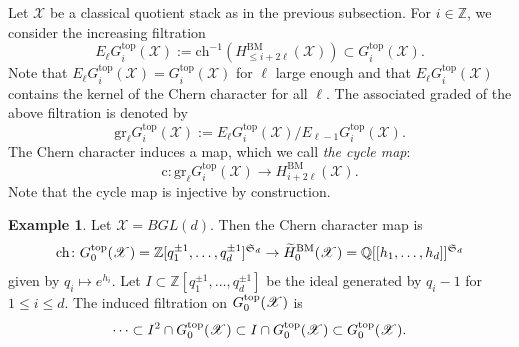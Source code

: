 \documentclass [11pt,oneside,a4paper,mathscr]{amsart}
\theoremstyle{definition}
\newtheorem{example}[thm]{Example}
\renewcommand{\leq}{\leqslant}
\newcommand{\X}{\mathscr{X}}
\newcommand{\ch}{\operatorname{ch}}
\begin{document}
Let $\X$ be a classical quotient stack as in the previous subsection.
For $i\in\mathbb{Z}$, we consider the increasing filtration 
\begin{equation}\label{def:filtration}
E_{ \ell}G^{\mathrm{top}}_i(\mathscr{X}):=\mathrm{ch}^{-1}\left(H^{\mathrm{BM}}_{\leq i+2\ell}(\mathscr{X})\right)\subset G^{\mathrm{top}}_i(\mathscr{X}).
\end{equation}
Note that $E_{\ell}G^{\mathrm{top}}_i(\mathscr{X})=G^{\mathrm{top}}_i(\mathscr{X})$ for $\ell$ large enough and that $E_{\ell}G^{\mathrm{top}}_i(\mathscr{X})$ contains the kernel of the Chern character for all $\ell$. 
The associated graded of the above filtration is denoted by 
\[\mathrm{gr}_\ell G^{\mathrm{top}}_i(\mathscr{X}):=E_{\ell}G^{\mathrm{top}}_i(\mathscr{X})/E_{\ell-1}G^{\mathrm{top}}_i(\mathscr{X}).\]
The Chern character induces a map, which we call \textit{the cycle map}:
\begin{equation}\label{cherngraded}
\mathrm{c}\colon \mathrm{gr}_\ell G^{\mathrm{top}}_i(\mathscr{X})\to H^{\mathrm{BM}}_{i+2\ell}(\mathscr{X}).
\end{equation}
Note that the cycle map is injective by construction.
\begin{example}\label{exam:BGL}
Let $\X=BGL(d)$. Then the Chern character map is 
\begin{align*}
    \ch \colon G_0^{\rm{top}}(\X)=\mathbb{Z}[q_1^{\pm 1}, \ldots, q_d^{\pm 1}]^{\mathfrak{S}_d}
    \to \widetilde{H}_0^{\rm{BM}}(\X)=\mathbb{Q}[[h_1, \ldots, h_d]]^{\mathfrak{S}_d}
\end{align*}
given by $q_i \mapsto e^{h_i}$. 
Let $I \subset \mathbb{Z}[q_1^{\pm 1}, \ldots, q_d^{\pm 1}]$ be the ideal 
generated by $q_i-1$ for $1\leq i\leq d$. 
The induced filtration on 
$G_0^{\rm{top}}(\X)$ is 
\begin{align*}
    \cdots \subset I^2 \cap G_0^{\rm{top}}(\X) \subset 
    I \cap G_0^{\rm{top}}(\X) \subset G_0^{\rm{top}}(\X). 
\end{align*}
\end{example}


\end{document}
